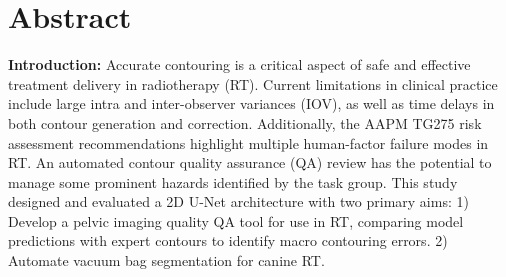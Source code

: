 \chapter{Abstract} \label{ch:abstract}

\textbf{Introduction:}
Accurate contouring is a critical aspect of safe and effective treatment
delivery in radiotherapy (RT). Current limitations in clinical practice include
large intra and inter-observer variances (IOV), as well as time delays in both
contour generation and correction. Additionally, the AAPM TG275 risk assessment
recommendations highlight multiple human-factor failure modes in RT. An
automated contour quality assurance (QA) review has the potential to manage some
prominent hazards identified by the task group. This study designed and
evaluated a 2D U-Net architecture with two primary aims: 1) Develop a pelvic
imaging quality QA tool for use in RT, comparing model predictions with expert
contours to identify macro contouring errors. 2) Automate vacuum bag
segmentation for canine RT.

